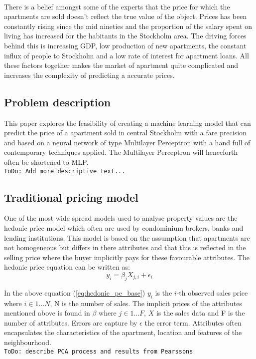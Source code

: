 \\
There is a belief amongst some of the experts that the price for which the apartments are sold doesn't reflect the true value of the object. Prices has been constantly rising since the mid nineties and the proportion of the salary spent on living has increased for the habitants in the Stockholm area. The driving forces behind this is increasing GDP, low production of new apartments, the constant influx of people to Stockholm and a low rate of interest for apartment loans. All these factors together makes the market of apartment quite complicated and increases the complexity of predicting a accurate prices.


\subsection{Problem description}
This paper explores the feasibility of creating a machine learning model that can predict the price of a apartment sold in central Stockholm with a fare precision and based on a neural network of type Multilayer Perceptron with a hand full of contemporary techniques applied. The Multilayer Perceptron will henceforth often be shortened to MLP.
\\
\texttt{ToDo: Add more descriptive text...} 
\\

\subsection{Traditional pricing model} \label{sss:hedonic}
One of the most wide spread models used to analyse property values are the hedonic price model which often are used by condominium brokers, banks and lending institutions. This model is based on the assumption that apartments are not homogeneous but differs in there attributes and that this is reflected in the selling price where the buyer implicitly pays for these favourable attributes. The hedonic price equation can be written as:
\begin{equation} \label{eq:hedonic_pe_base} 
y_{i} = \beta_{j} X_{j,i}  + \epsilon_{i}
\end{equation}

In the above equation (\ref{eq:hedonic_pe_base}) $y_{i}$ is the $i$-th observed sales price where $i \in 1 \ldots N$, N is the number of sales. The implicit prices of the attributes mentioned above is found in $\beta$ where $j \in 1 \ldots F$, $X$ is the sales data and F is the number of attributes. Errors are capture by $\epsilon$ the error term. Attributes often encapsulates the characteristics of the apartment, location and features of the neighbourhood.  
\\
\texttt{ToDo: describe PCA process and results from Pearssons} 
\\


